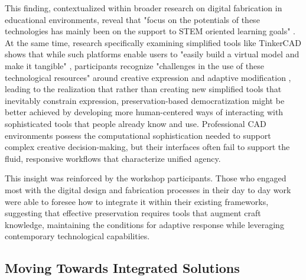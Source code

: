 This finding, contextualized within broader research on digital fabrication in educational environments, reveal that "focus on the potentials of these technologies has mainly been on the support to STEM oriented learning goals" \citep{smith2016}. At the same time, research specifically examining simplified tools like TinkerCAD shows that while such platforms enable users to "easily build a virtual model and make it tangible" \citep{barbosa2024}, participants recognize "challenges in the use of these technological resources" around creative expression and adaptive modification \citep{barbosa2024}, leading to the realization that rather than creating new simplified tools that inevitably constrain expression, preservation-based democratization might be better achieved by developing more human-centered ways of interacting with sophisticated tools that people already know and use. Professional CAD environments possess the computational sophistication needed to support complex creative decision-making, but their interfaces often fail to support the fluid, responsive workflows that characterize unified agency.

\vspace{0.5cm}

This insight was reinforced by the workshop participants. Those who engaged most with the digital design and fabrication processes in their day to day work were able to foresee how to integrate it within their existing frameworks, suggesting that effective preservation requires tools that augment craft knowledge, maintaining the conditions for adaptive response while leveraging contemporary technological capabilities.

\subsection{Moving Towards Integrated Solutions}







\vspace{0.5cm}
\vspace{0.5cm}
\vspace{0.5cm}
\vspace{0.5cm}
\vspace{0.5cm}
\vspace{0.5cm}
\vspace{0.5cm}
\vspace{0.5cm}
\vspace{0.5cm}
\vspace{0.5cm}
\vspace{0.5cm}
\vspace{0.5cm}
\vspace{0.5cm}
\vspace{0.5cm}



